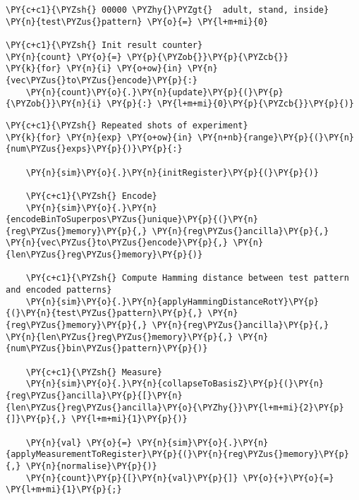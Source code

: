     \begin{tcolorbox}[breakable, size=fbox, boxrule=1pt, pad at break*=1mm,colback=cellbackground, colframe=cellborder]
\begin{Verbatim}[commandchars=\\\{\}]
\PY{c+c1}{\PYZsh{} 00000 \PYZhy{}\PYZgt{}  adult, stand, inside}
\PY{n}{test\PYZus{}pattern} \PY{o}{=} \PY{l+m+mi}{0}

\PY{c+c1}{\PYZsh{} Init result counter}
\PY{n}{count} \PY{o}{=} \PY{p}{\PYZob{}}\PY{p}{\PYZcb{}}
\PY{k}{for} \PY{n}{i} \PY{o+ow}{in} \PY{n}{vec\PYZus{}to\PYZus{}encode}\PY{p}{:}
    \PY{n}{count}\PY{o}{.}\PY{n}{update}\PY{p}{(}\PY{p}{\PYZob{}}\PY{n}{i} \PY{p}{:} \PY{l+m+mi}{0}\PY{p}{\PYZcb{}}\PY{p}{)}
\end{Verbatim}
\end{tcolorbox}

    \begin{tcolorbox}[breakable, size=fbox, boxrule=1pt, pad at break*=1mm,colback=cellbackground, colframe=cellborder]
\begin{Verbatim}[commandchars=\\\{\}]
\PY{c+c1}{\PYZsh{} Repeated shots of experiment}
\PY{k}{for} \PY{n}{exp} \PY{o+ow}{in} \PY{n+nb}{range}\PY{p}{(}\PY{n}{num\PYZus{}exps}\PY{p}{)}\PY{p}{:}

    \PY{n}{sim}\PY{o}{.}\PY{n}{initRegister}\PY{p}{(}\PY{p}{)}

    \PY{c+c1}{\PYZsh{} Encode}
    \PY{n}{sim}\PY{o}{.}\PY{n}{encodeBinToSuperpos\PYZus{}unique}\PY{p}{(}\PY{n}{reg\PYZus{}memory}\PY{p}{,} \PY{n}{reg\PYZus{}ancilla}\PY{p}{,} \PY{n}{vec\PYZus{}to\PYZus{}encode}\PY{p}{,} \PY{n}{len\PYZus{}reg\PYZus{}memory}\PY{p}{)}

    \PY{c+c1}{\PYZsh{} Compute Hamming distance between test pattern and encoded patterns}
    \PY{n}{sim}\PY{o}{.}\PY{n}{applyHammingDistanceRotY}\PY{p}{(}\PY{n}{test\PYZus{}pattern}\PY{p}{,} \PY{n}{reg\PYZus{}memory}\PY{p}{,} \PY{n}{reg\PYZus{}ancilla}\PY{p}{,} \PY{n}{len\PYZus{}reg\PYZus{}memory}\PY{p}{,} \PY{n}{num\PYZus{}bin\PYZus{}pattern}\PY{p}{)}

    \PY{c+c1}{\PYZsh{} Measure}
    \PY{n}{sim}\PY{o}{.}\PY{n}{collapseToBasisZ}\PY{p}{(}\PY{n}{reg\PYZus{}ancilla}\PY{p}{[}\PY{n}{len\PYZus{}reg\PYZus{}ancilla}\PY{o}{\PYZhy{}}\PY{l+m+mi}{2}\PY{p}{]}\PY{p}{,} \PY{l+m+mi}{1}\PY{p}{)}
    
    \PY{n}{val} \PY{o}{=} \PY{n}{sim}\PY{o}{.}\PY{n}{applyMeasurementToRegister}\PY{p}{(}\PY{n}{reg\PYZus{}memory}\PY{p}{,} \PY{n}{normalise}\PY{p}{)}
    \PY{n}{count}\PY{p}{[}\PY{n}{val}\PY{p}{]} \PY{o}{+}\PY{o}{=} \PY{l+m+mi}{1}\PY{p}{;}
\end{Verbatim}
\end{tcolorbox}

